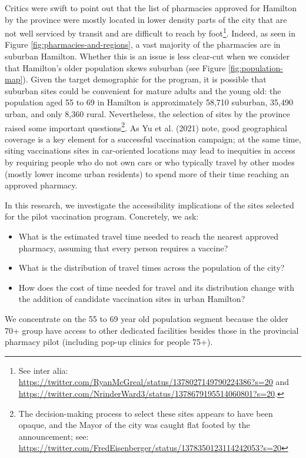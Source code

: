 \documentclass[]{elsarticle} %
\providecommand{\tightlist}{%
  \setlength{\itemsep}{0pt}\setlength{\parskip}{0pt}}
\begin{document}
Critics were swift to point out that the list of pharmacies approved for
Hamilton by the province were mostly located in lower density parts of
the city that are not well serviced by transit and are difficult to
reach by
foot\footnote{See inter alia: \url{https://twitter.com/RyanMcGreal/status/1378027149790224386?s=20} and \url{https://twitter.com/NrinderWard3/status/1378679195514060801?s=20}.}.
Indeed, as seen in Figure \ref{fig:pharmacies-and-regions}, a vast
majority of the pharmacies are in suburban Hamilton. Whether this is an
issue is less clear-cut when we consider that Hamilton's older
population skews suburban (see Figure \ref{fig:population-map}). Given
the target demographic for the program, it is possible that suburban
sites could be convenient for mature adults and the young old: the
population aged 55 to 69 in Hamilton is approximately 58,710 suburban,
35,490 urban, and only 8,360 rural. Nevertheless, the selection of sites
by the province raised some important
questions\footnote{The decision-making process to select these sites appears to have been opaque, and the Mayor of the city was caught flat footed by the announcement; see: \url{https://twitter.com/FredEisenberger/status/1378350123114242053?s=20}}.
As Yu et al. (2021) note, good geographical coverage is a key element
for a successful vaccination campaign; at the same time, siting
vaccinations sites in car-oriented locations may lead to inequities in
access by requiring people who do not own cars or who typically travel
by other modes (mostly lower income urban residents) to spend more of
their time reaching an approved pharmacy.

In this research, we investigate the accessibility implications of the
sites selected for the pilot vaccination program. Concretely, we ask:

\begin{itemize}
\tightlist
\item
  What is the estimated travel time needed to reach the nearest approved
  pharmacy, assuming that every person requires a vaccine?
\item
  What is the distribution of travel times across the population of the
  city?
\item
  How does the cost of time needed for travel and its distribution
  change with the addition of candidate vaccination sites in urban
  Hamilton?
\end{itemize}

We concentrate on the 55 to 69 year old population segment because the
older 70+ group have access to other dedicated facilities besides those
in the provincial pharmacy pilot (including pop-up clinics for people
75+).
\end{document}
